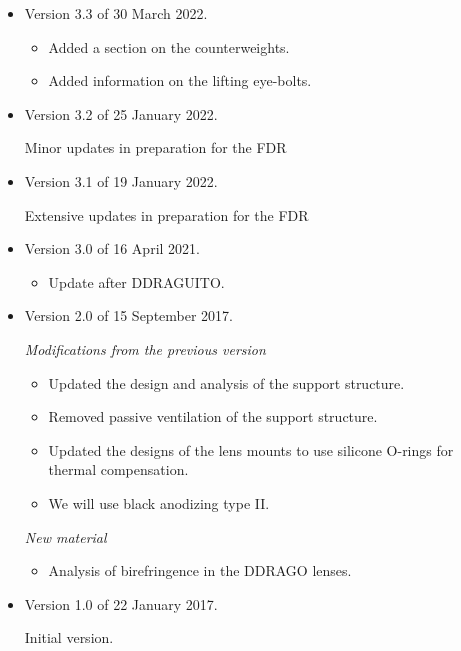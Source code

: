 \documentclass{report}
\begin{document}
\begin{itemize}
\item Version 3.3 of 30 March 2022.

\begin{itemize}
\item Added a section on the counterweights.
\item Added information on the lifting eye-bolts.

\end{itemize}

\item Version 3.2 of 25 January 2022.

Minor updates in preparation for the FDR

\item Version 3.1 of 19 January 2022.

Extensive updates in preparation for the FDR

\item Version 3.0 of 16 April 2021.

\begin{itemize}
\item Update after DDRAGUITO.
\end{itemize}

\item Version 2.0 of 15 September 2017.

{\it Modifications from the previous version}

\begin{itemize}
\item Updated the design and analysis of the support structure.
\item Removed passive ventilation of the support structure.
\item Updated the designs of the lens mounts to use silicone O-rings for thermal compensation.
\item We will use black anodizing type II.
\end{itemize}

{\it New material}
\begin{itemize}
\item Analysis of birefringence in the DDRAGO lenses.
\end{itemize}

\item Version 1.0 of 22 January 2017.

Initial version.
\end{itemize}

\clearpage
\end{document}

